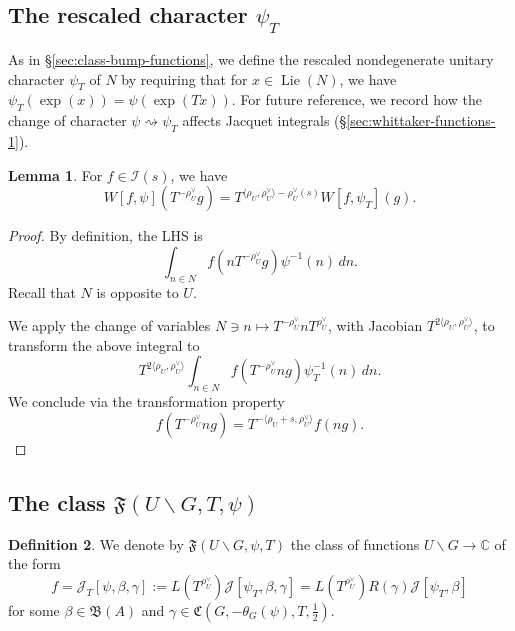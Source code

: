 \documentclass[reqno]{amsart}
\DeclareMathOperator{\Lie}{Lie}
\theoremstyle{plain} \newtheorem{theorem} {Theorem}
\theoremstyle{definition} \newtheorem{definition} [theorem] {Definition}
\theoremstyle{itplain} %
\newtheorem{lemma}[theorem]{Lemma}
\numberwithin{equation}{section}
\numberwithin{theorem}{section}
\begin{document}
\subsection{The rescaled character $\psi_T$}

As in \S\ref{sec:class-bump-functions}, we define the rescaled nondegenerate unitary character $\psi_T$ of $N$ by requiring that for $x \in \Lie(N)$, we have $\psi_T(\exp(x)) = \psi(\exp(T x))$.  For future reference, we record how the change of character $\psi \rightsquigarrow \psi_T$ affects Jacquet integrals (\S\ref{sec:whittaker-functions-1}).
\begin{lemma}\label{lem:phi-in-mathcalis}
  For $f \in \mathcal{I}(s)$, we  have
  \begin{equation*}
    W[f, \psi](T^{-\rho_U^\vee} g) = T^{\langle \rho_U, \rho_U^\vee  \rangle - \rho_U^\vee(s)} W[f, \psi_T](g).
  \end{equation*}
\end{lemma}
\begin{proof}
  By definition, the LHS is
  \[
    \int _{n \in N} f(n T^{-\rho_U^\vee} g) \psi^{-1}(n) \,  d n.
  \]
  Recall that $N$ is opposite to $U$.

  We apply the change of variables $N \ni n \mapsto T^{-\rho_U^\vee} n T^{\rho_U^\vee}$, with Jacobian $T^{2 \langle \rho_U, \rho_U^\vee  \rangle}$, to transform the above integral to
  \[
    T^{2 \langle \rho_U, \rho_U^\vee  \rangle}
    \int _{n \in N} f(T^{-\rho_U^\vee} n g) \psi_T^{-1}(n) \,  d n.
  \]
  We conclude via the transformation property
  \begin{equation*}
    f(T^{-\rho_U^\vee} n g) =
    T ^{-\langle \rho_U + s,  \rho_U^\vee \rangle } f(n g).
  \end{equation*}
\end{proof}



\subsection{The class $\mathfrak{F}(U \backslash G, T, \psi)$}


\begin{definition}\label{defn:standard2:we-denote-mathfrakfu}
  We denote by $\mathfrak{F}(U \backslash G, \psi, T)$ the class  of functions $U \backslash G \rightarrow \mathbb{C}$ of the form
  \begin{equation*}
    f =
    \mathcal{J}_T[\psi,\beta,\gamma]
    :=
    L(T ^{\rho _U ^\vee })
    \mathcal{J}[\psi_T,\beta,\gamma]
    =
    L(T ^{\rho _U ^\vee })
    R(\gamma)
    \mathcal{J}[\psi_T,\beta]
  \end{equation*}
  for some $\beta \in \mathfrak{B}(A)$ and $\gamma \in \mathfrak{C}(G,-\theta_G(\psi),T,\tfrac{1}{2})$.
\end{definition}
\end{document}
